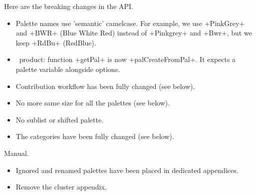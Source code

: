 \documentclass{tutodoc}
\begin{document}
\small

\begin{tdocbreak}
    \item Here are the breaking changes in the API.
    \begin{itemize}
        \item Palette names use 'semantic' camelcase. For example, we use +PinkGrey+ and +BWR+ (Blue White Red) instead of +Pinkgrey+ and +Bwr+, but we keep +RdBu+ (RedBlue).


        \item \lua\ product: function +getPal+ is now +palCreateFromPal+. It expects a palette variable alongside options.


        \item Contribution workflow has been fully changed (see below).


        \item No more same size for all the palettes (see below).


        \item No sublist or shifted palette.


        \item The categories have been fully changed (see below).
    \end{itemize}


    \item Manual.
    \begin{itemize}
        \item Ignored and renamed palettes have been placed in dedicated appendices.

        \item Remove the cluster appendix.
    \end{itemize}
\end{tdocbreak}


\end{document}
